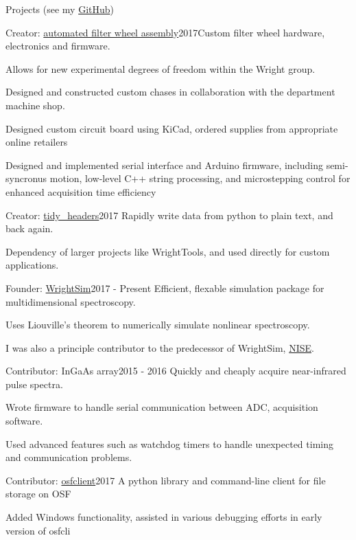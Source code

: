 \documentclass{resume}  %
\begin{document}
\begin{rSection}{Projects (see my \href{https://github.com/untzag}{GitHub})}
\begin{rSubsection}{Creator: \href{https://github.com/wright-group/FilterWheels}{automated filter
        wheel assembly}}{2017}{Custom filter wheel hardware, electronics and firmware.}{}
    \item Allows for new experimental degrees of freedom within the Wright group.
    \item Designed and constructed custom chases in collaboration with the department machine shop.
    \item Designed custom circuit board using KiCad, ordered supplies from appropriate online
      retailers
    \item Designed and implemented serial interface and Arduino firmware, including semi-syncronus
      motion, low-level C++ string processing, and microstepping control for enhanced acquisition
      time efficiency
  \end{rSubsection}
  \begin{rSubsection}{Creator: \href{https://github.com/untzag/tidy_headers}{tidy\_headers}}{2017}
    {Rapidly write data from python to plain text, and back again.}{}
    \item Dependency of larger projects like WrightTools, and used directly for custom
      applications.
  \end{rSubsection}
  \begin{rSubsection}{Founder: \href{https://github.com/wright-group/WrightSim}{WrightSim}}{2017 -
      Present}
    {Efficient, flexable simulation package for multidimensional spectroscopy.}{}
    \item Uses Liouville's theorem to numerically simulate nonlinear spectroscopy.
    \item I was also a principle contributor to the predecessor of WrightSim,
      \href{https://github.com/wright-group/NISE}{NISE}.
  \end{rSubsection}
  \begin{rSubsection}{Contributor: InGaAs array}{2015 - 2016}
    {Quickly and cheaply acquire near-infrared pulse spectra.}{}
    \item Wrote firmware to handle serial communication between ADC, acquisition software.
    \item Used advanced features such as watchdog timers to handle unexpected timing and
      communication problems.
  \end{rSubsection}
  \begin{rSubsection}{Contributor: \href{https://github.com/dib-lab/osf-cli}{osfclient}}{2017}
    {A python library and command-line client for file storage on OSF}{}
    \item Added Windows functionality, assisted in various debugging efforts in early version of
      osfcli
  \end{rSubsection}
\end{rSection}
\end{document}
